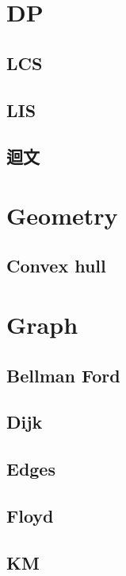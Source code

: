 \section{DP}
    \subsection{LCS}
        
    \subsection{LIS}
        
    \subsection{迴文}
        

\section{Geometry}
    \subsection{Convex hull}
        

\section{Graph}
    \subsection{Bellman Ford}
        
    \subsection{Dijk}
        
    \subsection{Edges}
            
    \subsection{Floyd}
        
    \subsection{KM}
        
